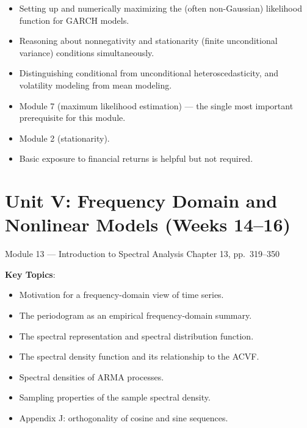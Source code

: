 \documentclass[11pt]{article}
\newcommand{\keytopics}{\textbf{\color{modblue}Key Topics}}
\begin{document}
\begin{difficult}
\begin{itemize}
  \item Setting up and numerically maximizing the (often non-Gaussian) likelihood function for GARCH models.
  \item Reasoning about nonnegativity and stationarity (finite unconditional variance) conditions simultaneously.
  \item Distinguishing conditional from unconditional heteroscedasticity, and volatility modeling from mean modeling.
\end{itemize}
\end{difficult}

\begin{prereqs}
\begin{itemize}
  \item Module 7 (maximum likelihood estimation) --- the single most important prerequisite for this module.
  \item Module 2 (stationarity).
  \item Basic exposure to financial returns is helpful but not required.
\end{itemize}
\end{prereqs}

\newpage
\section{Unit V: Frequency Domain and Nonlinear Models (Weeks 14--16)}

\begin{moduletitle}{Module 13 --- Introduction to Spectral Analysis}
\small Chapter 13, pp.\ 319--350
\end{moduletitle}

\keytopics:
\begin{itemize}
  \item Motivation for a frequency-domain view of time series.
  \item The periodogram as an empirical frequency-domain summary.
  \item The spectral representation and spectral distribution function.
  \item The spectral density function and its relationship to the ACVF.
  \item Spectral densities of ARMA processes.
  \item Sampling properties of the sample spectral density.
  \item Appendix J: orthogonality of cosine and sine sequences.
\end{itemize}
\end{document}
